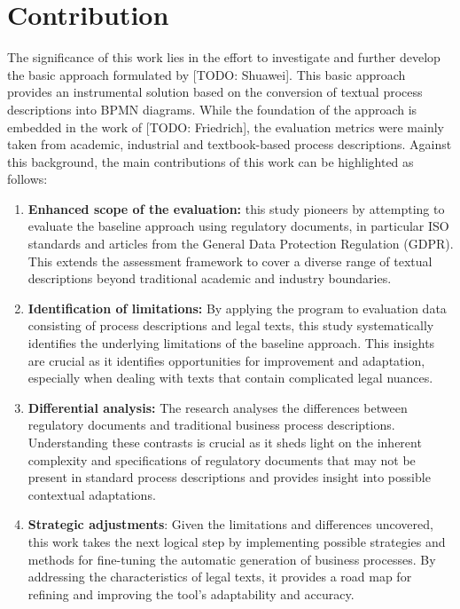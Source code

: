\section{Contribution}
\label{sec:intro:con}

The significance of this work lies in the effort to investigate and further develop the basic approach formulated by [TODO: Shuawei]. This basic approach provides an instrumental solution based on the conversion of textual process descriptions into BPMN diagrams. While the foundation of the approach is embedded in the work of [TODO: Friedrich], the evaluation metrics were mainly taken from academic, industrial and textbook-based process descriptions. Against this background, the main contributions of this work can be highlighted as follows:

\begin{enumerate}
\item \textbf{Enhanced scope of the evaluation: }this study pioneers by attempting to evaluate the baseline approach using regulatory documents, in particular ISO standards and articles from the General Data Protection Regulation (GDPR). This extends the assessment framework to cover a diverse range of textual descriptions beyond traditional academic and industry boundaries.
\item \textbf{Identification of limitations: }By applying the program to evaluation data consisting of process descriptions and legal texts, this study systematically identifies the underlying limitations of the baseline approach. This insights are crucial as it identifies opportunities for improvement and adaptation, especially when dealing with texts that contain complicated legal nuances.
\item \textbf{Differential analysis:} The research analyses the differences between regulatory documents and traditional business process descriptions. Understanding these contrasts is crucial as it sheds light on the inherent complexity and specifications of regulatory documents that may not be present in standard process descriptions and provides insight into possible contextual adaptations.
\item \textbf{Strategic adjustments}: Given the limitations and differences uncovered, this work takes the next logical step by implementing possible strategies and methods for fine-tuning the automatic generation of business processes. By addressing the characteristics of legal texts, it provides a road map for refining and improving the tool's adaptability and accuracy.
\end{enumerate}

